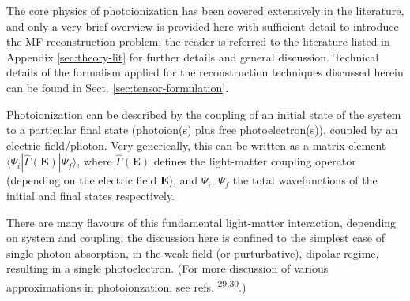 \documentclass[10pt]{article}
\begin{document}


The core physics of photoionization has been covered extensively in the literature, and only a very brief overview is provided here with sufficient detail to introduce the MF reconstruction problem; the reader is referred to the literature listed in Appendix \ref{sec:theory-lit} for further details and general discussion. Technical details of the formalism applied for the reconstruction techniques discussed herein can be found in Sect. \ref{sec:tensor-formulation}.

Photoionization can be described by the coupling of an initial state of the system to a particular final state (photoion(s) plus free photoelectron(s)), coupled by an electric field/photon. Very generically, this can be written as a matrix element $\langle\Psi_i|\hat{\Gamma}(\boldsymbol{\mathbf{E}})|\Psi_f\rangle$, where $\hat{\Gamma}(\boldsymbol{\mathbf{E}})$ defines the light-matter coupling operator (depending on the electric field $\boldsymbol{\mathbf{E}}$), and $\Psi_i$, $\Psi_f$ the total wavefunctions of the initial and final states respectively. 

There are many flavours of this fundamental light-matter interaction, depending on system and coupling; the discussion here is confined to the simplest case of single-photon absorption, in the weak field (or purturbative), dipolar regime, resulting in a single photoelectron. (For more discussion of various approximations in photoionzation, see refs. \textsuperscript{\hyperref[csl:29]{29},\hyperref[csl:30]{30}}.)

\end{document}
